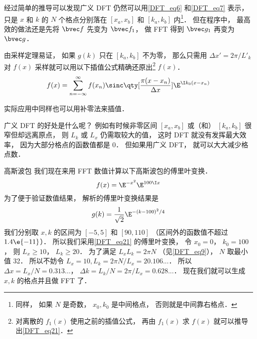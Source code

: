 经过简单的推导可以发现广义 DFT 仍然可以用\autoref{DFT_eq6} 和\autoref{DFT_eq7} 表示， 只是 $x$ 和 $k$ 的 $N$ 个格点分别落在 $[x_a, x_b]$ 和 $[k_a, k_b]$ 内\footnote{同样， 如果 $N$ 是奇数， $x_0, k_0$ 是中间格点， 否则就是中间靠右格点．}． 但在程序中， 最高效的做法还是先将 $\bvec f$ 先变为 $\bvec f_1$， 做 FFT 得到 $\bvec g_1$ 再变为 $\bvec g$．

由采样定理易证， 如果 $g(k)$ 只在 $[k_a, k_b]$ 不为零， 那么只需用 $\Delta x' = 2\pi/L'_k$ 对 $f(x)$ 采样就可以用以下插值公式精确还原出\footnote{对离散的 $f_1(x)$ 使用之前的插值公式， 再由 $f_1(x)$ 求 $f(x)$ 就可以推导出\autoref{DFT_eq21}．} $f(x)$．
\begin{equation}\label{DFT_eq21}
f(x) = \sum_{n = -\infty}^{\infty} f(x_n)\sinc\qty[\frac{\pi(x - x_n)}{\Delta x}] \E^{\I k_0 (x-x_n)}
\end{equation}

实际应用中同样也可以用补零法来插值．

广义 DFT 的好处是什么呢？ 例如有时候非零区间 $[x_a, x_b]$ 或（和） $[k_a, k_b]$ 很窄但却远离原点， 则 $L_k$ 或 $L_x$ 仍需取较大的值， 这时 DFT 就没有发挥最大效率， 因为大部分格点的函数值都是 0． 但如果用广义 DFT， 就可以大大减少格点数．

\begin{example}{高斯波包}
我们现在来用 FFT 数值计算以下高斯波包的傅里叶变换．
\begin{equation}
f(x) = \E^{-x^2}\E^{100 \I x}
\end{equation}
为了便于验证数值结果， 解析的傅里叶变换结果是%
\begin{equation}
g(k) = \frac{1}{\sqrt2}\E^{-(k-100)^2/4}
\end{equation}
我们分别取 $x, k$ 的区间为 $[-5, 5]$ 和 $[90, 110]$ （区间外的函数值不超过 $1.4\e{-11}$）． 所以我们采用\autoref{DFT_eq21} 的傅里叶变换， 令 $x_0 = 0$， $k_0 = 100$， 则 $L_x \geqslant 10$， $L_k \geqslant 20$． 为了满足 $L_x L_k = 2\pi N$ （见\autoref{DFT_eq9}）， $N$ 取最小值 32． 所以不妨令 $L_x = 10, L_k = 2\pi N/L_x = 20.106...$．
所以 $\Delta x = L_x/N = 0.313...$， $\Delta k = L_k/N = 2\pi/L_x = 0.628...$． 现在我们就可以生成 $x, k$ 的格点并且做 FFT 了．
\end{example}
